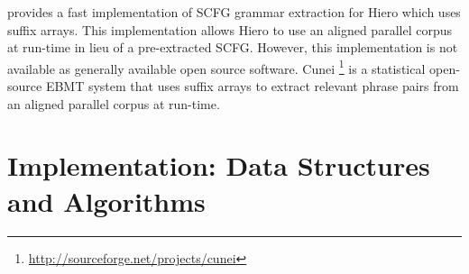 \documentclass{pbml}
\newcommand{\newcite}{\namecite}
\begin{document}
\newcite{Lopez2008} provides a fast implementation of SCFG grammar extraction for Hiero which uses suffix arrays. This implementation allows Hiero to use an aligned parallel corpus at run-time in lieu of a pre-extracted SCFG. However, this implementation is not available as generally available open source software. Cunei \cite{Phillips2009}\footnote{\url{http://sourceforge.net/projects/cunei}} is a statistical open-source EBMT system that uses suffix arrays to extract relevant phrase pairs from an aligned parallel corpus at run-time. 


\section{Implementation: Data Structures and Algorithms}
\label{data-structures}



\begin{figure}
\begin{algorithmic}[1]
			\State {}
			\State {}
			\State {}
			\State {}
		\EndIf
	\EndFor
	\State {}
\EndFunction
\end{algorithmic}
\caption{}
\label{sort}
\end{figure}
\end{document}

